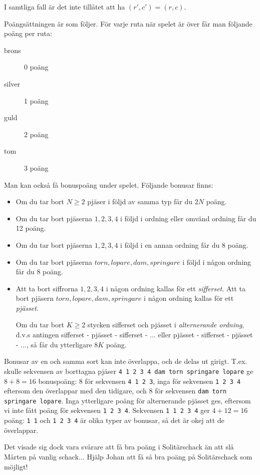 I samtliga fall är det inte tillåtet att ha $(r', c') = (r, c)$.

Poängsättningen är som följer. För varje ruta när spelet är över får man följande poäng per ruta:
\begin{description}
  \item[brons] 0 poäng
  \item[silver] 1 poäng
  \item[guld] 2 poäng
  \item[tom] 3 poäng
\end{description}

Man kan också få bonuspoäng under spelet. Följande bonusar finns:
\begin{itemize}
  \item Om du tar bort $N \ge 2$ pjäser i följd av samma typ får du $2N$ poäng.
  \item Om du tar bort pjäserna $1, 2, 3, 4$ i följd i ordning eller omvänd ordning får du 12 poäng.
  \item Om du tar bort pjäserna $1, 2, 3, 4$ i följd i en annan ordning får du 8 poäng.
  \item Om du tar bort pjäserna $torn, lopare, dam, springare$ i följd i någon ordning får du 8 poäng.
  \item Att ta bort siffrorna $1, 2, 3, 4$ i någon ordning kallas för ett \emph{sifferset}.
    Att ta bort pjäsern $torn, lopare, dam, springare$ i någon ordning kallas för ett \emph{pjässet}.

    Om du tar bort $K \ge 2$ stycken sifferset och pjässet i \emph{alternerande ordning}, d.v.s antingen
    sifferset - pjässet - sifferset - ... eller pjässet - sifferset - pjässet - ..., så får du
    ytterligare $8K$ poäng.
\end{itemize}

Bonusar av en och samma sort kan inte överlappa, och de delas ut girigt.
T.ex. skulle sekvensen av borttagna pjäser \texttt{4 1 2 3 4 dam torn springare lopare} ge $8 + 8 = 16$ bonuspoäng:
8 för sekvensen \texttt{4 1 2 3},
inga för sekvensen \texttt{1 2 3 4} eftersom den överlappar med den tidigare,
och 8 för sekvensen \texttt{dam torn springare lopare}.
Inga ytterligare poäng för alternerande pjässet ges, eftersom vi inte fått poäng för sekvensen \texttt{1 2 3 4}.
Sekvensen \texttt{1 1 2 3 4} ger $4 + 12 = 16$ poäng: \texttt{1 1} och \texttt{1 2 3 4} är olika typer av bonusar, så det är okej att de överlappar.

Det visade sig dock vara svårare att få bra poäng i Solitärschack än att slå Mårten på vanlig schack... Hjälp Johan att få så
bra poäng på Solitärschack som möjligt!

